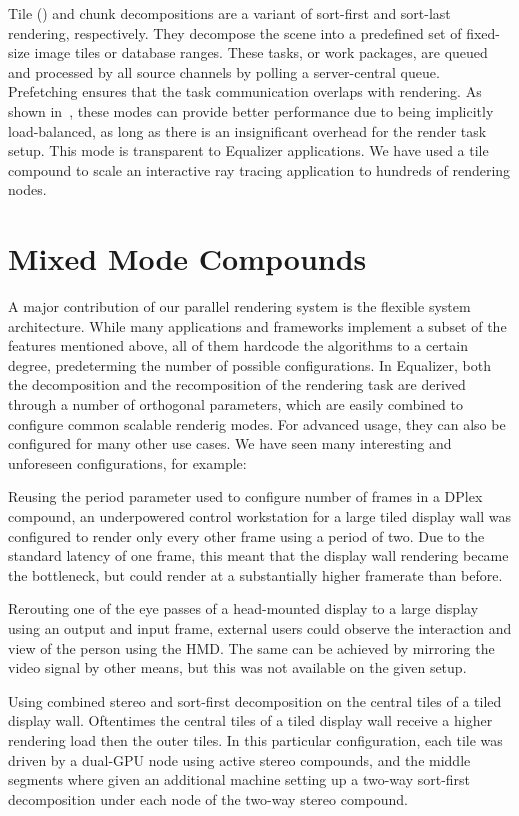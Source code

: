 Tile () and chunk decompositions are a variant of sort-first and
sort-last rendering, respectively. They decompose the scene into a predefined
set of fixed-size image tiles or database ranges. These tasks, or work packages,
are queued and processed by all source channels by polling a server-central
queue. Prefetching ensures that the task communication overlaps with rendering.
As shown in~\cite{SPEP:16}, these modes can provide better performance due to
being implicitly load-balanced, as long as there is an insignificant overhead
for the render task setup. This mode is transparent to \textsf{Equalizer}
applications. We have used a tile compound to scale an interactive ray tracing
application to hundreds of rendering nodes.

\section{Mixed Mode Compounds}

A major contribution of our parallel rendering system is the flexible system
architecture. While many applications and frameworks implement a subset of the
features mentioned above, all of them hardcode the algorithms to a certain
degree, predeterming the number of possible configurations. In Equalizer, both
the decomposition and the recomposition of the rendering task are derived
through a number of orthogonal parameters, which are easily combined to
configure common scalable renderig modes. For advanced usage, they can also be
configured for many other use cases. We have seen many interesting and
unforeseen configurations, for example:

\begin{compactitem}

\item Reusing the \textsf{period} parameter used to configure number of frames
in a DPlex compound, an underpowered control workstation for a large tiled
display wall was configured to render only every other frame using a period of
two. Due to the standard latency of one frame, this meant that the display wall
rendering became the bottleneck, but could render at a substantially higher
framerate than before.

\item Rerouting one of the eye passes of a head-mounted display to a large
display using an output and input frame, external users could observe the
interaction and view of the person using the HMD. The same can be achieved by
mirroring the video signal by other means, but this was not available on the
given setup.

\item Using combined stereo and sort-first decomposition on the central tiles of
a tiled display wall. Oftentimes the central tiles of a tiled display wall
receive a higher rendering load then the outer tiles. In this particular
configuration, each tile was driven by a dual-GPU node using active stereo
compounds, and the middle segments where given an additional machine setting up
a two-way sort-first decomposition under each node of the two-way stereo
compound.

\end{compactitem}

